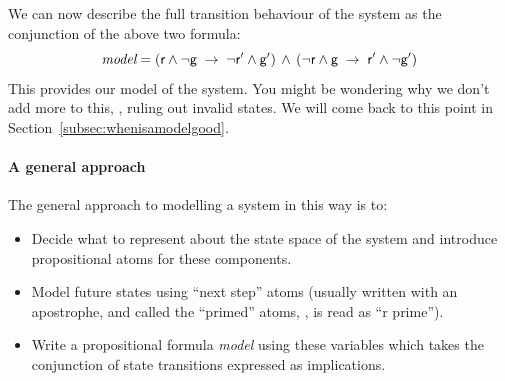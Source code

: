 We can now describe the full transition behaviour of the system as
the conjunction of the above two formula:
%
\begin{equation*}
\textit{model} =
(\textsf{r}{} \wedge \neg\textsf{g}{} \; \rightarrow \; \neg\textsf{r}{}' \wedge
\textsf{g}{}')
\, \wedge \,
(\neg\textsf{r}{} \wedge \textsf{g}{} \; \rightarrow \; \textsf{r}{}' \wedge \neg\textsf{g}{}')
\end{equation*}
%
This provides our model of the system. You might be wondering why we
don't add more to this, \eg{}, ruling out invalid states. We will come
back to this point in Section~\ref{subsec:whenisamodelgood}.


\paragraph{A general approach}

The general approach to modelling a system in this way is to:
%
\begin{itemize}
  \item Decide what to represent about the state space of the system
  and introduce propositional atoms for these components.
  \item Model future states using ``next step'' atoms (usually written with
  an apostrophe, and called the ``primed'' atoms, \eg{}, \atomrp{} is
  read as ``r prime'').
 \item Write a propositional formula \emph{model} using these
  variables which takes the conjunction of state transitions expressed
  as implications.
\end{itemize}

